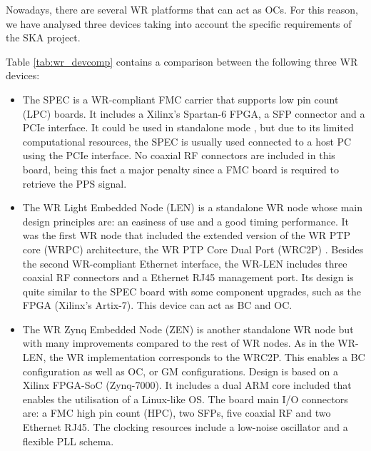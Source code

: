 Nowadays, there  are several WR platforms that can act as OCs. 
For this reason, we have analysed three devices taking into account the specific requirements of the SKA project.

Table \ref{tab:wr_devcomp} contains a comparison between the following three WR
devices: 

\begin{itemize} 
	\item The SPEC \cite{ohwr:spec} is a WR-compliant FMC carrier that supports low pin count (LPC) boards. It includes a Xilinx's Spartan-6 FPGA, a SFP connector and a PCIe interface. It could be used in standalone mode \cite{migueljl-paper-wr-spec}, but due to its limited computational resources, the SPEC is usually used connected to a host PC using the PCIe interface.  No coaxial RF connectors are included in this board, being this fact a major penalty since a FMC board is required to retrieve the PPS signal.
	
	\item The WR Light Embedded Node (LEN) \cite{sevensols:wr_len} is a 	standalone WR node whose main design principles are: an easiness of use and a good timing performance. It was the first WR node	that included the extended version of the WR PTP core (WRPC) architecture, the WR PTP Core Dual Port (WRC2P) \cite{torres2016scalability}. Besides the second WR-compliant Ethernet interface, the WR-LEN includes three coaxial RF
	connectors and a Ethernet RJ45 management port. Its design is quite similar to the SPEC board with some component upgrades, such as the FPGA (Xilinx's Artix-7). This device can act as BC and OC.
	
	\item The WR Zynq Embedded Node (ZEN) \cite{sevensols:wr_zen} is another
	standalone WR node but with many improvements compared to the rest of WR nodes. As in the WR-LEN, the WR implementation corresponds to the WRC2P.  This enables a BC configuration as well as OC, or GM configurations. Design is based on a Xilinx FPGA-SoC (Zynq-7000). It includes a dual ARM core included that enables the utilisation of a Linux-like	OS. The board main I/O connectors are: a FMC high pin count (HPC), two SFPs, five coaxial RF and two Ethernet RJ45. The clocking resources include a low-noise oscillator and a flexible PLL schema.
\end{itemize}

